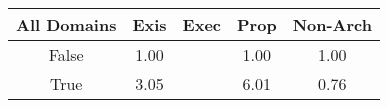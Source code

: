 \begin{tabular}{|c||c|c|c|c|}
\hline
All Domains & Exis & Exec & Prop & Non-Arch \\ 
\hline
False & \cellcolor[rgb]{0.9091396303736555,0.8359275837686356,0.4191969883487451} 1.00 &  & \cellcolor[rgb]{0.9078991926703754,0.8300561786397765,0.4180392464923503} 1.00 & \cellcolor[rgb]{0.9099881235772412,0.8399943743260616,0.42} 1.00 \\ 
\hline
True & \cellcolor[rgb]{0.7543738969297402,0.7662823722298769,0.42} 3.05 &  & \cellcolor[rgb]{0.53,0.66,0.42} 6.01 & \cellcolor[rgb]{0.76,0.13,0.28} 0.76 \\ 
\hline
\end{tabular}